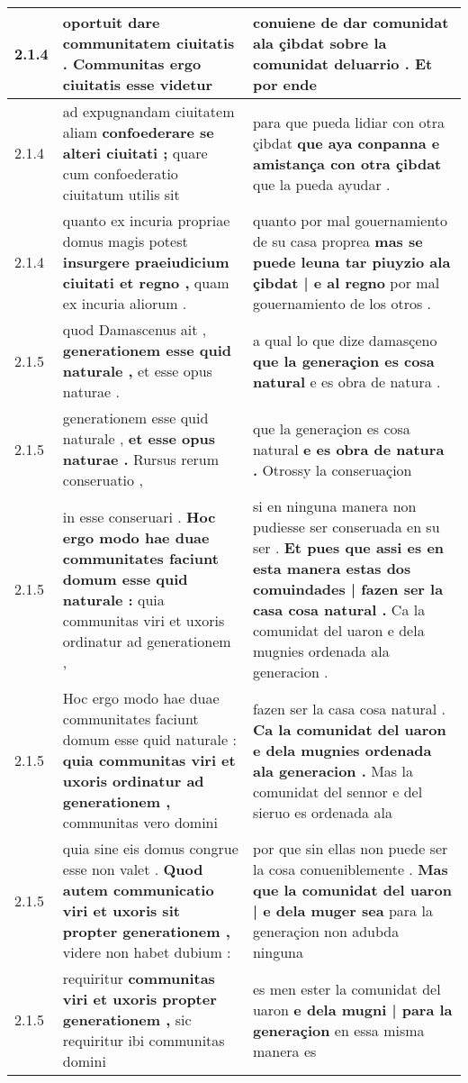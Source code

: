 \begin{tabular}{|p{1cm}|p{6.5cm}|p{6.5cm}|}
2.1.4 & oportuit \textbf{ dare communitatem ciuitatis . } Communitas ergo ciuitatis esse videtur & conuiene de dar comunidat ala çibdat \textbf{ sobre la comunidat deluarrio . } Et por ende \\\hline
2.1.4 & ad expugnandam ciuitatem aliam \textbf{ confoederare se alteri ciuitati ; } quare cum confoederatio ciuitatum utilis sit & para que pueda lidiar con otra çibdat \textbf{ que aya conpanna e amistança con otra çibdat } que la pueda ayudar . \\\hline
2.1.4 & quanto ex incuria propriae domus magis potest \textbf{ insurgere praeiudicium ciuitati et regno , } quam ex incuria aliorum . & quanto por mal gouernamiento de su casa proprea \textbf{ mas se puede leuna tar piuyzio ala çibdat | e al regno } por mal gouernamiento de los otros . \\\hline
2.1.5 & quod Damascenus ait , \textbf{ generationem esse quid naturale , } et esse opus naturae . & a qual lo que dize damasçeno \textbf{ que la generaçion es cosa natural } e es obra de natura . \\\hline
2.1.5 & generationem esse quid naturale , \textbf{ et esse opus naturae . } Rursus rerum conseruatio , & que la generaçion es cosa natural \textbf{ e es obra de natura . } Otrossy la conseruaçion \\\hline
2.1.5 & in esse conseruari . \textbf{ Hoc ergo modo hae duae communitates faciunt domum esse quid naturale : } quia communitas viri et uxoris ordinatur ad generationem , & si en ninguna manera non pudiesse ser conseruada en su ser . \textbf{ Et pues que assi es en esta manera estas dos comuindades | fazen ser la casa cosa natural . } Ca la comunidat del uaron e dela mugnies ordenada ala generacion . \\\hline
2.1.5 & Hoc ergo modo hae duae communitates faciunt domum esse quid naturale : \textbf{ quia communitas viri et uxoris ordinatur ad generationem , } communitas vero domini & fazen ser la casa cosa natural . \textbf{ Ca la comunidat del uaron e dela mugnies ordenada ala generacion . } Mas la comunidat del sennor e del sieruo es ordenada ala \\\hline
2.1.5 & quia sine eis domus congrue esse non valet . \textbf{ Quod autem communicatio viri et uxoris sit propter generationem , } videre non habet dubium : & por que sin ellas non puede ser la cosa conueniblemente . \textbf{ Mas que la comunidat del uaron | e dela muger sea } para la generaçion non adubda ninguna \\\hline
2.1.5 & requiritur \textbf{ communitas viri et uxoris propter generationem , } sic requiritur ibi communitas domini & es men ester la comunidat del uaron \textbf{ e dela mugni | para la generaçion } en essa misma manera es \\\hline

\end{tabular}
